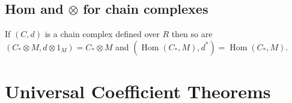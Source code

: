 \documentclass[10pt,]{book}
\theoremstyle{plain}
\theoremstyle{definition}
\numberwithin{equation}{section}
\DeclareMathOperator{\Hom}{Hom}
\begin{document}
\subsection[Hom and \(\otimes\) for chain complexes]{Hom and \(\otimes\) for chain complexes}\label{subsection-10}
If \((C, d)\) is a chain complex defined over \(R\) then so are \((C_*\otimes M, d\otimes 1_M) = C_* \otimes M\) and \((\Hom(C_*,M),d^*) = \Hom(C_*, M)\).%
\typeout{************************************************}
\typeout{************************************************}
\section[Universal Coefficient Theorems]{Universal Coefficient Theorems}\label{sec-ucts}
\typeout{************************************************}
\typeout{************************************************}
\end{document}
